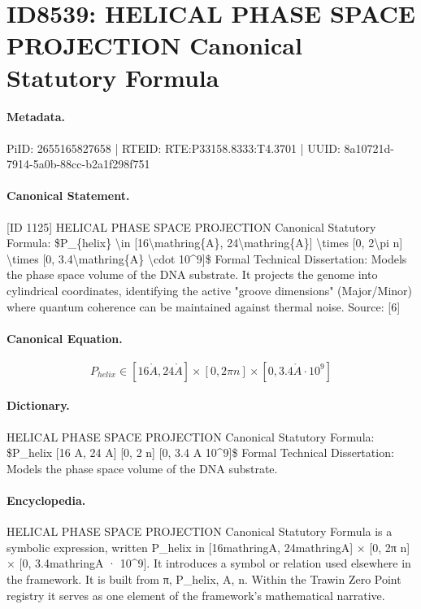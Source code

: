 \section*{ID8539: HELICAL PHASE SPACE PROJECTION Canonical Statutory Formula}
\paragraph{Metadata.}
PiID: 2655165827658 | RTEID: RTE:P33158.8333:T4.3701 | UUID: 8a10721d-7914-5a0b-88cc-b2a1f298f751

\paragraph{Canonical Statement.}
[ID 1125] HELICAL PHASE SPACE PROJECTION Canonical Statutory Formula: \$P\_\{helix\} \textbackslash{}in [16\textbackslash{}mathring\{A\}, 24\textbackslash{}mathring\{A\}] \textbackslash{}times [0, 2\textbackslash{}pi n] \textbackslash{}times [0, 3.4\textbackslash{}mathring\{A\} \textbackslash{}cdot 10\textasciicircum{}9]\$ Formal Technical Dissertation: Models the phase space volume of the DNA substrate. It projects the genome into cylindrical coordinates, identifying the active "groove dimensions" (Major/Minor) where quantum coherence can be maintained against thermal noise. Source: [6]

\paragraph{Canonical Equation.}
\[
P_{helix} \in [16\mathring{A}, 24\mathring{A}] \times [0, 2\pi n] \times [0, 3.4\mathring{A} \cdot 10^9]
\]

\paragraph{Dictionary.}
HELICAL PHASE SPACE PROJECTION Canonical Statutory Formula: \$P\_helix [16 A, 24 A] [0, 2 n] [0, 3.4 A 10\textasciicircum{}9]\$ Formal Technical Dissertation: Models the phase space volume of the DNA substrate.

\paragraph{Encyclopedia.}
HELICAL PHASE SPACE PROJECTION Canonical Statutory Formula is a symbolic expression, written P\_helix in [16mathringA, 24mathringA] × [0, 2π n] × [0, 3.4mathringA · 10\textasciicircum{}9]. It introduces a symbol or relation used elsewhere in the framework. It is built from π, P\_helix, A, n. Within the Trawin Zero Point registry it serves as one element of the framework's mathematical narrative.
